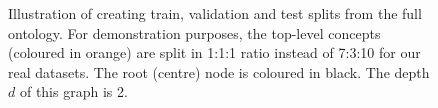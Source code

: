\begin{figure}[t]
    \caption{Illustration of creating train, validation and test splits from the full ontology. For demonstration purposes, the top-level concepts (coloured in orange) are split in 1:1:1 ratio instead of 7:3:10 for our real datasets. The root (centre) node is coloured in black. The depth $d$ of this graph is 2.}
    \label{fig:train-test-split}
\end{figure}
